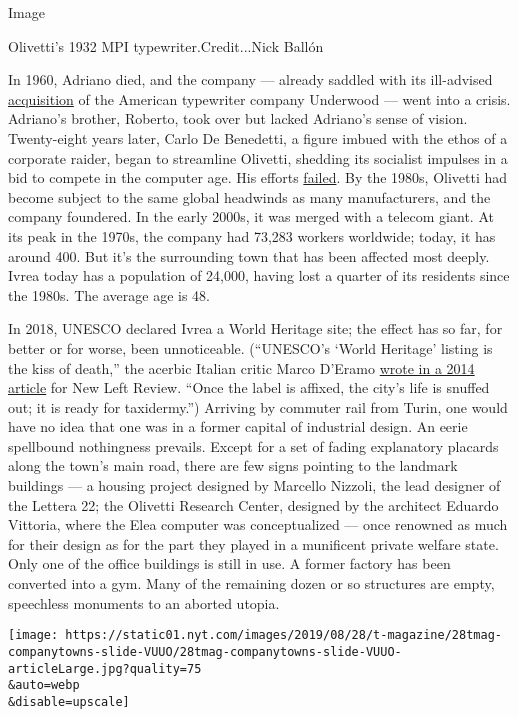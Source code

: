 Image

Olivetti's 1932 MPI typewriter.Credit...Nick Ballón

In 1960, Adriano died, and the company --- already saddled with its
ill-advised
\href{https://www.nytimes.com/1963/10/26/archives/olivetti-underwood-corp-completes-merger-terms.html}{acquisition}
of the American typewriter company Underwood --- went into a crisis.
Adriano's brother, Roberto, took over but lacked Adriano's sense of
vision. Twenty-eight years later, Carlo De Benedetti, a figure imbued
with the ethos of a corporate raider, began to streamline Olivetti,
shedding its socialist impulses in a bid to compete in the computer age.
His efforts
\href{https://www.nytimes.com/1996/09/04/business/de-benedetti-steps-down-as-the-chairman-of-olivetti.html}{failed}.
By the 1980s, Olivetti had become subject to the same global headwinds
as many manufacturers, and the company foundered. In the early 2000s, it
was merged with a telecom giant. At its peak in the 1970s, the company
had 73,283 workers worldwide; today, it has around 400. But it's the
surrounding town that has been affected most deeply. Ivrea today has a
population of 24,000, having lost a quarter of its residents since the
1980s. The average age is 48.

In 2018, UNESCO declared Ivrea a World Heritage site; the effect has so
far, for better or for worse, been unnoticeable. (``UNESCO's `World
Heritage' listing is the kiss of death,'' the acerbic Italian critic
Marco D'Eramo
\href{https://newleftreview.org/issues/II88/articles/marco-d-eramo-unescocide}{wrote
in a 2014 article} for New Left Review. ``Once the label is affixed, the
city's life is snuffed out; it is ready for taxidermy.'') Arriving by
commuter rail from Turin, one would have no idea that one was in a
former capital of industrial design. An eerie spellbound nothingness
prevails. Except for a set of fading explanatory placards along the
town's main road, there are few signs pointing to the landmark buildings
--- a housing project designed by Marcello Nizzoli, the lead designer of
the Lettera 22; the Olivetti Research Center, designed by the architect
Eduardo Vittoria, where the Elea computer was conceptualized --- once
renowned as much for their design as for the part they played in a
munificent private welfare state. Only one of the office buildings is
still in use. A former factory has been converted into a gym. Many of
the remaining dozen or so structures are empty, speechless monuments to
an aborted utopia.

\texttt{[image: https://static01.nyt.com/images/2019/08/28/t-magazine/28tmag-companytowns-slide-VUUO/28tmag-companytowns-slide-VUUO-articleLarge.jpg?quality=75\\\&auto=webp\\\&disable=upscale]}

